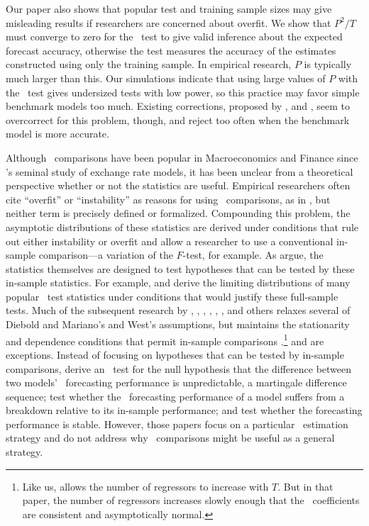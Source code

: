 \documentclass[11pt]{article}
\newcommand{\citepos}[1]{\citeauthor{#1}'s \citeyearpar{#1}}
\begin{document}
Our paper also shows that popular test and training sample sizes may
give misleading results if researchers are concerned about overfit.
We show that $P^2/T$ must converge to zero for the \dmw\ test to give
valid inference about the expected forecast accuracy, otherwise the
test measures the accuracy of the estimates constructed using only the
training sample.  In empirical research, $P$ is typically much larger
than this.  Our simulations indicate that using large values of $P$
with the \dmw\ test gives undersized tests with low power, so this
practice may favor simple benchmark models too much.  Existing
corrections, proposed by \citet{ClM:01,ClM:05}, \citet{Mcc:07} and
\citet{ClW:06,ClW:07}, seem to overcorrect for this problem, though, and reject
too often when the benchmark model is more accurate.


Although \oos\ comparisons have been popular in Macroeconomics and
Finance since \citepos{MeR:83} seminal study of exchange rate models,
it has been unclear from a theoretical perspective whether or not the
statistics are useful.  Empirical researchers often cite ``overfit''
or ``instability'' as reasons for using \oos\ comparisons, as in
\citet{StW:03}, but neither term is precisely defined or formalized.
Compounding this problem, the asymptotic distributions of these
statistics are derived under conditions that rule out either
instability or overfit and allow a researcher to use a conventional
in-sample comparison---a variation of the $F$-test, for example.  As
\citet{InK:04} argue, the statistics themselves are designed to test
hypotheses that can be tested by these in-sample statistics.  For
example, \citet{DiM:95} and \citet{Wes:96} derive the limiting
distributions of many popular \oos\ test statistics under conditions
that would justify these full-sample tests.  Much
of the subsequent research by \citet{Mcc:00, Mcc:07}, \citet{CCS:01},
\citet{ClM:01,ClM:05}, \citet{CoS:02,CoS:04}, \citet{ClW:06,ClW:07},
\citet{Ana:07}, and others relaxes several of Diebold and Mariano's
and West's assumptions, but maintains the stationarity and dependence
conditions that permit in-sample comparisons \citep[see][for a
review of this literature]{Wes:06}.\footnote{Like us, \citet{Ana:07}
  allows the number of regressors to increase with $T$.  But in that
  paper, the number of regressors increases slowly enough that the \ols\
  coefficients are consistent and asymptotically normal.} \citet{GiW:06} and
\citet{GiR:09, GiR:10} are exceptions.  Instead of focusing on
hypotheses that can be tested by in-sample comparisons, \citet{GiW:06}
derive an \oos\ test for the null hypothesis that the difference
between two models' \oos\ forecasting performance is unpredictable, a
martingale difference sequence; \citet{GiR:09} test whether the \oos\
forecasting performance of a model suffers from a breakdown relative
to its in-sample performance; and \citet{GiR:10} test whether the
forecasting performance is stable. However, those papers focus on a
particular \oos\ estimation strategy and do not address why \oos\
comparisons might be useful as a general strategy.
\end{document}
